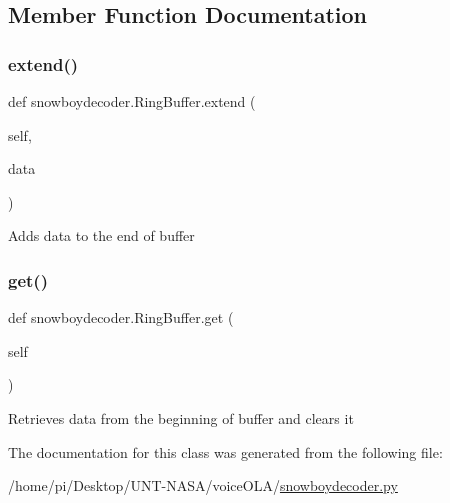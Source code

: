\subsection{Member Function Documentation}
\mbox{\label{classsnowboydecoder_1_1RingBuffer_a8abd8bc5da6f36309861332258669790}} 
\subsubsection{\texorpdfstring{extend()}{extend()}}
{\footnotesize\ttfamily def snowboydecoder.\+Ring\+Buffer.\+extend (\begin{DoxyParamCaption}\item[{}]{self,  }\item[{}]{data }\end{DoxyParamCaption})}

\begin{DoxyVerb}Adds data to the end of buffer\end{DoxyVerb}
 \mbox{\label{classsnowboydecoder_1_1RingBuffer_ad083eb25f13fa3d7947caf62ca0d7353}} 
\subsubsection{\texorpdfstring{get()}{get()}}
{\footnotesize\ttfamily def snowboydecoder.\+Ring\+Buffer.\+get (\begin{DoxyParamCaption}\item[{}]{self }\end{DoxyParamCaption})}

\begin{DoxyVerb}Retrieves data from the beginning of buffer and clears it\end{DoxyVerb}
 

The documentation for this class was generated from the following file\+:\begin{DoxyCompactItemize}
\item 
/home/pi/\+Desktop/\+U\+N\+T-\/\+N\+A\+S\+A/voice\+O\+L\+A/\hyperlink{snowboydecoder_8py}{snowboydecoder.\+py}\end{DoxyCompactItemize}
